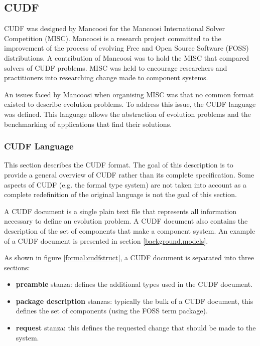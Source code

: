 \subsection{CUDF}
\label{formal.cudfDesign}
CUDF was designed by Mancoosi for the Mancoosi International Solver Competition (MISC).
Mancoosi is a research project committed to the improvement of the process of evolving Free and Open Source Software (FOSS) distributions.
A contribution of Mancoosi was to hold the MISC that compared solvers of CUDF problems.
MISC was held to encourage researchers and practitioners into researching change made to component systems.

An issues faced by Mancoosi when organising MISC was that no common format existed to describe evolution problems.
To address this issue, the CUDF language \citep{treinen2009common} was defined.
This language allows the abstraction of evolution problems and the benchmarking of applications that find their solutions. 

\subsubsection{CUDF Language}
This section describes the CUDF format.
The goal of this description is to provide a general overview of CUDF rather than its complete specification.
Some aspects of CUDF (e.g. the formal type system) are not taken into account  as a complete redefinition of the original language is not the goal of this section.

A CUDF document is a single plain text file that represents all information necessary to define an evolution problem.
A CUDF document also contains the description of the set of components that make a component system.
An example of a CUDF document is presented in section \ref{background.models}.

As shown in figure \ref{formal:cudfstruct}, a CUDF document is separated into three sections:
\begin{itemize}
  \item \textbf{preamble} stanza: defines the additional types used in the CUDF document.
  \item \textbf{package description} stanzas: typically the bulk of a CUDF document, this defines the set of components (using the FOSS term package).
  \item \textbf{request} stanza: this defines the requested change that should be made to the system.
\end{itemize}

